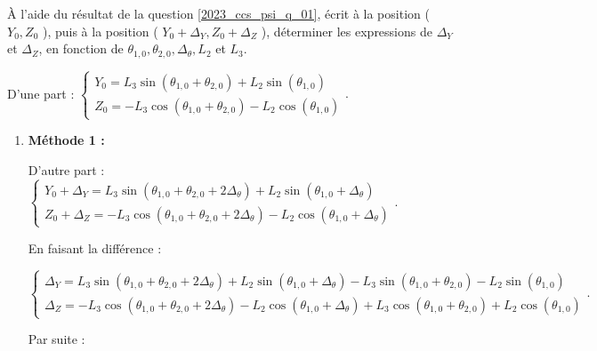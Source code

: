 \begin{question}
\label{2023_ccs_psi_q_02}
À l'aide du résultat de la question \ref{2023_ccs_psi_q_01}, écrit à la position ( $Y_{0}, Z_{0}$ ), puis à la position ( $Y_{0}+\Delta_{Y}, Z_{0}+\Delta_{Z}$ ), déterminer les expressions de $\Delta_{Y}$ et $\Delta_{Z}$, en fonction de $\theta_{1,0}, \theta_{2,0}, \Delta_{\theta}, L_{2}$ et $L_{3}$.\\
\end{question}
\ifprof
\begin{corrige}

D'une part : 
$
\left\{
\begin{array}{l}
Y_0 =  L_3 \sin  \left(\theta_{1,0}+ \theta_{2,0} \right)  + L_2 \sin \left(\theta_{1,0}  \right) \\
Z_0 =- L_3 \cos \left(\theta_{1,0} + \theta_{2,0} \right) - L_2 \cos \left(\theta_{1,0} \right)  
\end{array}.
\right.
$


\begin{enumerate}
\item \textbf{Méthode 1 : }

D'autre part : 
$
\left\{
\begin{array}{l}
Y_0 +\Delta_{Y}=  L_3 \sin  \left(\theta_{1,0}+ \theta_{2,0} + 2\Delta_{\theta} \right)  + L_2 \sin \left(\theta_{1,0} + \Delta_{\theta} \right) \\
Z_0 +\Delta_{Z}=- L_3 \cos \left(\theta_{1,0} + \theta_{2,0}+ 2\Delta_{\theta} \right) - L_2 \cos \left(\theta_{1,0}+\Delta_{\theta} \right)  
\end{array}.
\right.
$

En faisant la différence :

$
\left\{
\begin{array}{l}
\Delta_{Y}=  L_3 \sin  \left(\theta_{1,0}+ \theta_{2,0} + 2\Delta_{\theta} \right)  + L_2 \sin \left(\theta_{1,0} + \Delta_{\theta} \right)  - L_3 \sin  \left(\theta_{1,0}+ \theta_{2,0} \right)  - L_2 \sin \left(\theta_{1,0}  \right)\\
\Delta_{Z}=- L_3 \cos \left(\theta_{1,0} + \theta_{2,0}+ 2\Delta_{\theta} \right) - L_2 \cos \left(\theta_{1,0}+\Delta_{\theta} \right)   +  L_3 \cos \left(\theta_{1,0} + \theta_{2,0} \right) + L_2 \cos \left(\theta_{1,0} \right)
\end{array}.
\right.
$

Par suite : 


\end{enumerate}
\end{corrige}
